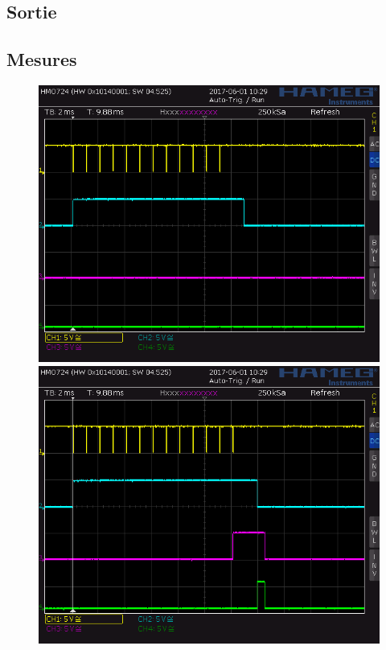 \documentclass[french]{layout/Report}
\begin{document}
\subsection{Sortie}

\subsection{Mesures}

\begin{figure}
\begin{minipage}[b]{0.5\linewidth}
\centering
\includegraphics[width=\textwidth]{../measurements/SCR06}
\end{minipage}
\hspace{0.05cm}
\begin{minipage}[b]{0.5\linewidth}
\centering
\includegraphics[width=\textwidth]{../measurements/SCR07}

\end{minipage}
\end{figure}
\end{document}
